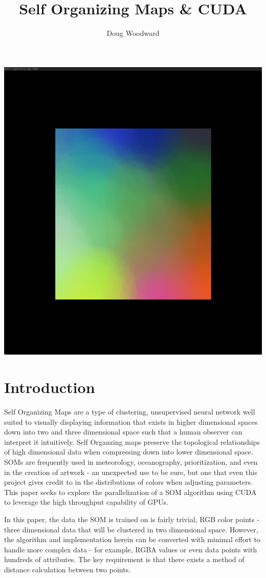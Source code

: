 \documentclass[11pt]{article}
\title{\textbf{Self Organizing Maps \& CUDA}}
\author{Doug Woodward}
\date{}
\begin{document}
\maketitle
\includegraphics[scale=.15]{title}
\section{Introduction}

Self Organizing Maps are a type of clustering, unsupervised neural network well suited to visually displaying information that exists in higher dimensional spaces down into two and three dimensional space such that a human observer can interpret it intuitively. Self Organzing maps preserve the topological relationships of high dimensional data when compressing down into lower dimensional space. SOMs are frequently used in meteorology, oceanography, prioritization, and even in the creation of artwork - an unexpected use to be sure, but one that even this project gives credit to in the distributions of colors when adjusting parameters. This paper seeks to explore the parallelization of a SOM algorithm using CUDA to leverage the high throughput capability of GPUs.

In this paper, the data the SOM is trained on is fairly trivial, RGB color points - three dimensional data that will be clustered in two dimensional space. However, the algorithm and implementation herein can be converted with minimal effort to handle more complex data - for example, RGBA values or even data points with hundreds of attributes. The key requirement is that there exists a method of distance calculation between two points.
\end{document}
